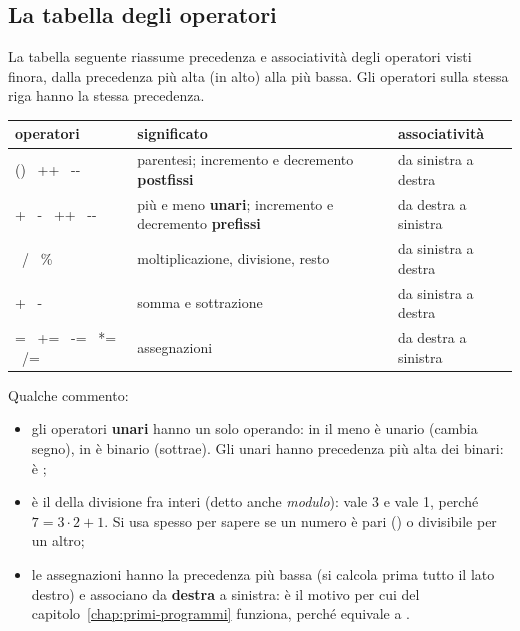 \subsection{La tabella degli operatori}

La tabella seguente riassume precedenza e associatività degli operatori
visti finora, dalla precedenza più alta (in alto) alla più bassa. Gli
operatori sulla stessa riga hanno la stessa precedenza.

\begin{center}
\renewcommand{\arraystretch}{1.35}
\begin{tabular}{@{}>{\FiraCodeNL}l l l@{}}
  \toprule
  \normalfont\textbf{operatori} & \textbf{significato} & \textbf{associatività} \\
  \midrule
  () \ ++ \ -{}- & parentesi; incremento e decremento \textbf{postfissi} & da sinistra a destra \\
  + \ - \ ++ \ -{}- & più e meno \textbf{unari}; incremento e decremento \textbf{prefissi} & da destra a sinistra \\
  * \ / \ \% & moltiplicazione, divisione, resto & da sinistra a destra \\
  + \ - & somma e sottrazione & da sinistra a destra \\
  = \ += \ -= \ *= \ /= & assegnazioni & da destra a sinistra \\
  \bottomrule
\end{tabular}
\end{center}

Qualche commento:

\begin{itemize}
  \item gli operatori \textbf{unari} hanno un solo operando: in  il
        meno è unario (cambia segno), in  è binario (sottrae).
        Gli unari hanno precedenza più alta dei binari:  è
        ;
  \item \code{\%} è il  della divisione fra interi (detto anche
        \textit{modulo}):  vale 3 e  vale 1, perché
        $7 = 3 \cdot 2 + 1$. Si usa spesso per sapere se un numero è pari
        () o divisibile per un altro;
  \item le assegnazioni hanno la precedenza più bassa (si calcola prima
        tutto il lato destro) e associano da \textbf{destra} a sinistra: è
        il motivo per cui  del
        capitolo~\ref{chap:primi-programmi} funziona, perché equivale a
        .
\end{itemize}

